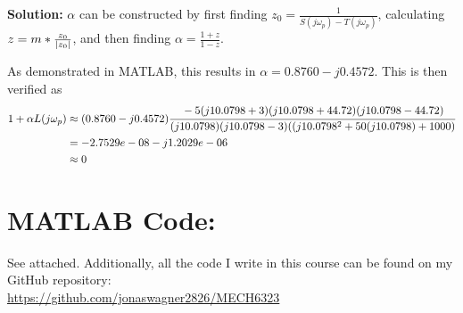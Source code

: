 \documentclass[letter]{article}
\numberwithin{equation}{section}
\begin{document}
\textbf{Solution:}
$\alpha$ can be constructed by first finding $z_0 = \frac{1}{S(j\omega_p)-T(j\omega_p)}$, 
calculating $z = m * \frac{z_0}{\abs{z_0}}$, 
and then finding $\alpha = \frac{1+z}{1-z}$.

As demonstrated in MATLAB, this results in $\alpha = 0.8760 - j 0.4572$.
This is then verified as
\begin{align*}
	1 + \alpha L(j\omega_p) 
	&\approx (0.8760 - j 0.4572) \cfrac{
			-5 (j 10.0798+3) (j 10.0798+44.72) (j 10.0798-44.72)
		}{
			(j 10.0798) (j 10.0798-3) ((j 10.0798^2 + 50(j 10.0798) + 1000)
		}\\
	&= -2.7529e-08 - j 1.2029e-06\\
	&\approx 0
\end{align*}



\newpage
\appendix
\section{MATLAB Code:}\label{apx:matlab}
See attached.
Additionally, all the code I write in this course can be found on my GitHub repository:\\
\href{https://github.com/jonaswagner2826/MECH6323}{https://github.com/jonaswagner2826/MECH6323}


\end{document}
